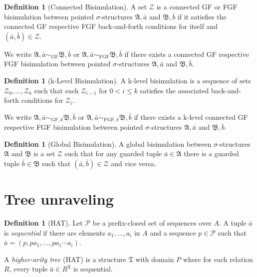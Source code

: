\documentclass[draft]{scrartcl}
\theoremstyle{definition}
\newtheorem{definition}[theorem]{Definition}
\begin{document}
\begin{definition}[Connected Bisimulation]
A set $\mathcal{Z}$ is a connected GF or FGF bisimulation between pointed $\sigma$-structures $\mathfrak{A}, \bar{a}$ and $\mathfrak{B}, \bar{b}$ if it satisfies the connected GF respective FGF back-and-forth conditions for itself and $(\bar{a}, \bar{b}) \in \mathcal{Z}$.
\end{definition}

We write $\mathfrak{A}, \bar{a} \sim_{\textrm{GF}} \mathfrak{B}, \bar{b}$ or $\mathfrak{A}, \bar{a} \sim_{\textrm{FGF}} \mathfrak{B}, \bar{b}$ if there exists a connected GF respective FGF bisimulation between pointed $\sigma$-structures $\mathfrak{A}, \bar{a}$ and $\mathfrak{B}, \bar{b}$.

\begin{definition}[k-Level Bisimulation]
A k-level bisimulation is a sequence of sets $\mathcal{Z}_0, \ldots, \mathcal{Z}_k$ such that each $\mathcal{Z}_{i - 1}$ for $0 < i \le k$ satisfies the associated back-and-forth conditions for $\mathcal{Z}_i$.
\end{definition}

We write $\mathfrak{A}, \bar{a} \sim_{\textrm{GF}, k} \mathfrak{B}, \bar{b}$ or $\mathfrak{A}, \bar{a} \sim_{\textrm{FGF}, k} \mathfrak{B}, \bar{b}$ if there exists a k-level connected GF respective FGF bisimulation between pointed $\sigma$-structures $\mathfrak{A}, \bar{a}$ and $\mathfrak{B}, \bar{b}$.

\begin{definition}[Global Bisimulation]
A global bisimulation between $\sigma$-structures $\mathfrak{A}$ and $\mathfrak{B}$ is a set $\mathcal{Z}$ such that for any guarded tuple $\bar{a} \in \mathfrak{A}$ there is a guarded tuple $\bar{b} \in \mathfrak{B}$ such that $(\bar{a}, \bar{b}) \in \mathcal{Z}$ and vice versa.
\end{definition}

\section{Tree unraveling}

\begin{definition}[HAT]
Let $\mathcal{P}$ be a prefix-closed set of sequences over $A$.
A tuple $\bar{a}$ is \emph{sequential} if there are elements $a_1, \ldots, a_i$ in $A$ and a sequence $p \in \mathcal{P}$ such that $\bar{a} = (p, p a_1, \ldots, p a_1 \cdots a_i)$.

A \emph{higher-arity tree} (HAT) is a structure $\mathfrak{T}$ with domain $P$ where for each relation $R$, every tuple $\bar{a} \in R^\mathfrak{T}$ is sequential.
\end{definition}
\end{document}
